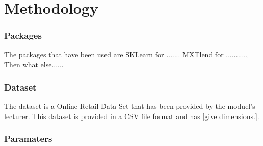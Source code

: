 
\section{Methodology}\label{Methodology}


	\subsubsection{Packages}
	\label{description}
	
		The packages that have been used are SKLearn for ....... MXTlend for .........., Then what else......
	\subsubsection{Dataset}
	\label{Dataset}
		
		The dataset is a Online Retail Data Set that has been provided by the moduel's lecturer. This dataset is provided in a CSV file format and has [give dimensions.].
	
	\subsubsection{Paramaters}
	\label{Proposed Solution}

